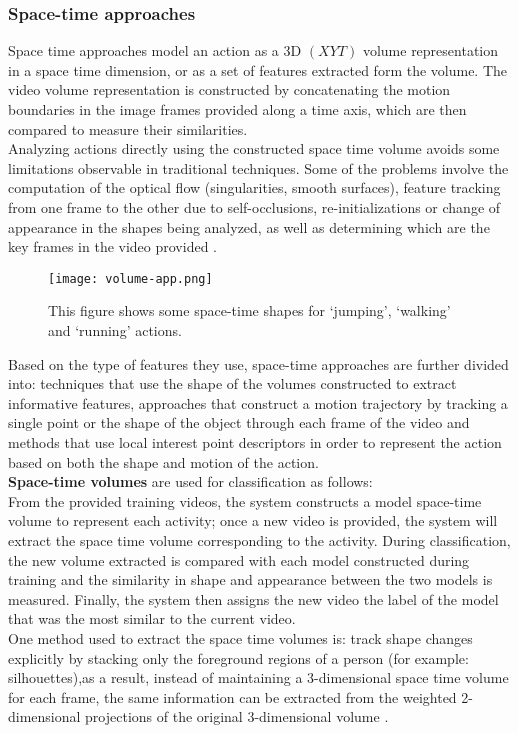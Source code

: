 \documentclass[11pt]{report}
\begin{document}
\subsubsection{Space-time approaches}
Space time approaches model an action as a 3D \((XYT)\) volume representation in a space time dimension, or as a set of features extracted form the volume. The video volume representation is constructed by concatenating the motion boundaries in the image frames provided along a time axis, which are then compared to measure their similarities. \\ 
Analyzing actions directly using the constructed space time volume avoids some limitations observable in traditional techniques. Some of the problems involve the computation of the optical flow (singularities, smooth surfaces), feature tracking from one frame to the other due to self-occlusions, re-initializations or change of appearance in the shapes being analyzed,  as well as determining which are the key frames in the video provided \cite{s-t-shapes}. \\  

\begin{figure}
    \centering
    \texttt{[image: volume-app.png]}
    \caption{This figure shows  some space-time shapes for `jumping', `walking' and `running' actions.}
    \label{fig:volume-app}
\end{figure}

Based on the type of features they use, space-time approaches are further divided into: techniques that use the shape of the volumes constructed to extract informative features, approaches that construct a motion trajectory by tracking a single point or the shape of the object through each frame of the video \cite{actions-as-objects} and methods that use local interest point descriptors in order to represent the action based on both the shape and motion of the action. \\

\textbf{Space-time volumes} are used for classification as follows:\\
From the provided training videos, the system constructs a model space-time volume to represent each activity;  once a new video is provided, the system will extract the space time volume corresponding to the activity. During classification, the new volume extracted is compared with each model constructed during training and the similarity in shape and appearance between the two models is measured. Finally, the system then assigns the new video the label of the model that was the most similar to the current video.\\ 
One method used to extract the space time volumes is: track shape changes explicitly by stacking only the foreground regions of a person (for example: silhouettes),as a result, instead of maintaining a 3-dimensional space time volume for each frame, the same information can be extracted from the weighted 2-dimensional projections of the original 3-dimensional volume \cite{silhouettes}. \\
\end{document}
